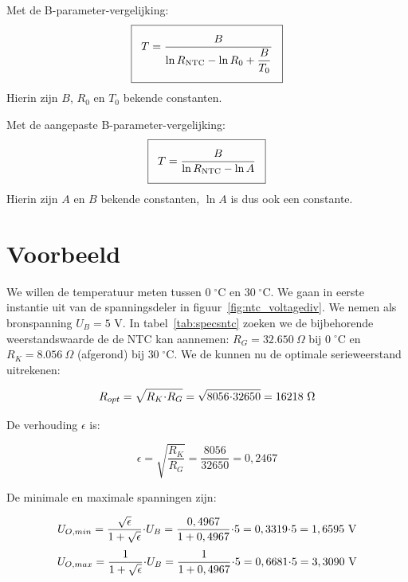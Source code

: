 \documentclass[12pt,a4paper,final,twoside,fleqn]{article}
\newcommand{\mathcelc}[1]{\mbox{$#1\;^\circ\text{C}$}}
\newcommand{\rntc}{R_\text{NTC}}
\newcommand{\ropt}{R_{opt}}
\let\oldcdot\cdot
\renewcommand{\cdot}{\kern-.10em\oldcdot\kern-.10em}
\begin{document}
Met de B-parameter-vergelijking:
\begin{equation}
\label{equ:invertedsteinharthartsimpl}
\setlength\fboxsep{2ex}
\boxed{T = \dfrac{B}{\ln \rntc - \ln R_0 + \dfrac{B}{T_0}}}
\end{equation}
Hierin zijn $B$, $R_0$ en $T_0$ bekende constanten.


Met de aangepaste B-parameter-vergelijking:
\begin{equation}
\label{equ:invertedsteinharthartadapt}
\setlength\fboxsep{2ex}
\boxed{T = \dfrac{B}{\ln \rntc - \ln A}}
\end{equation}
Hierin zijn $A$ en $B$ bekende constanten, $\ln A$ is dus ook een constante.



\clearpage
\section{Voorbeeld}
We willen de temperatuur meten tussen \mathcelc{0} en \mathcelc{30}. We gaan in
eerste instantie uit van de spanningsdeler in figuur~\ref{fig:ntc_voltagediv}.
We nemen als bronspanning $U_B=5$ V. In
tabel~\ref{tab:specsntc} zoeken we de bijbehorende weerstandswaarde de de NTC
kan aannemen: $R_G=32.650\ \Omega$ bij \mathcelc{0} en $R_K= 8.056\ \Omega$
(afgerond) bij \mathcelc{30}. We de kunnen nu de optimale serieweerstand uitrekenen:

\begin{equation}
\ropt = \sqrt{R_K\cdot R_G} = \sqrt{8056\cdot32650} = 16218\ \Omega
\end{equation}

De verhouding $\epsilon$ is: 

\begin{equation}
\epsilon = \sqrt{\dfrac{R_K}{R_G}} = \dfrac{8056}{32650} = 0,2467
\end{equation}

De minimale en maximale spanningen zijn:

\begin{equation}
U_{O,min} = \dfrac{\sqrt{\epsilon}}{1+\sqrt{\epsilon}}\cdot U_B
          = \dfrac{0,4967}{1+0,4967}\cdot 5 = 0,3319\cdot 5
          = 1,6595\ \text{V}
\end{equation}
\begin{equation}
U_{O,max} = \dfrac{1}{1+\sqrt{\epsilon}}\cdot U_B
          = \dfrac{1}{1+0,4967}\cdot 5 = 0,6681\cdot 5
          = 3,3090\ \text{V}
\end{equation}
\end{document}
